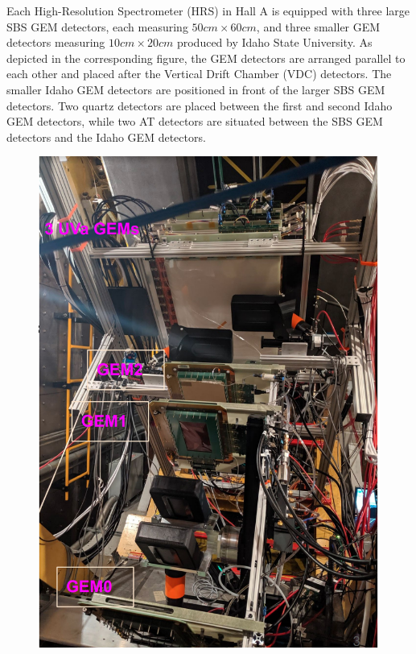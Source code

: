 Each High-Resolution Spectrometer (HRS) in Hall A is equipped with three large SBS GEM detectors, each measuring $50 cm \times 60 cm$, and three smaller GEM detectors measuring $10 cm \times 20 cm$ produced by Idaho State University. As depicted in the corresponding figure, the GEM detectors are arranged parallel to each other and placed after the Vertical Drift Chamber (VDC) detectors. The smaller Idaho GEM detectors are positioned in front of the larger SBS GEM detectors. Two quartz detectors are placed between the first and second Idaho GEM detectors, while two AT detectors are situated between the SBS GEM detectors and the Idaho GEM detectors.


\begin{figure}[!htbp]
  \centering
  \begin{minipage}[b]{0.45\textwidth}
    \includegraphics[width=\textwidth]{images/chap5/gem_in_apparatus_photo.png}

\end{minipage}
\end{figure}
